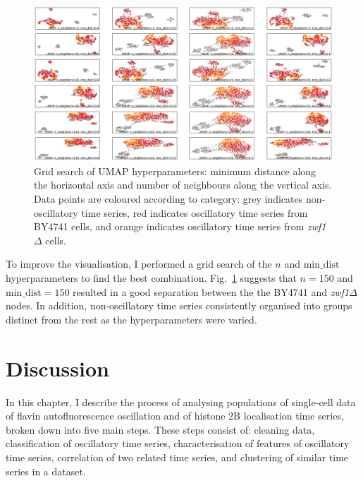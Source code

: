 
\begin{figure}
  \centering
    \includegraphics[width=0.9\linewidth]{IdenFeatures_20016_UMAP_22_cropped}
    \caption[
      Grid search of UMAP hyperparameters
    ]{
      Grid search of UMAP hyperparameters: minimum distance along the horizontal axis and number of neighbours along the vertical axis.
      Data points are coloured according to category: grey indicates non-oscillatory time series, red indicates oscillatory time series from BY4741 cells, and orange indicates oscillatory time series from \textit{zwf1$\Delta$} cells.
    }
  \label{fig:umap-gridsearch}
\end{figure}

To improve the visualisation, I performed a grid search of the $n$ and $\mathrm{min\_dist}$ hyperparameters to find the best combination.
Fig.\ \ref{fig:umap-gridsearch} suggests that $n=150$ and $\mathrm{min\_dist} = 150$ resulted in a good separation between the the BY4741 and \textit{zwf1$\Delta$} nodes.
In addition, non-oscillatory time series consistently organised into groups distinct from the rest as the hyperparameters were varied.


\section{Discussion}
\label{sec:analysis-discussion}

In this chapter, I describe the process of analysing populations of single-cell data of flavin autofluorescence oscillation and of histone 2B localisation time series, broken down into five main steps.
These steps consist of: cleaning data, classification of oscillatory time series, characterisation of features of oscillatory time series, correlation of two related time series, and clustering of similar time series in a dataset.

